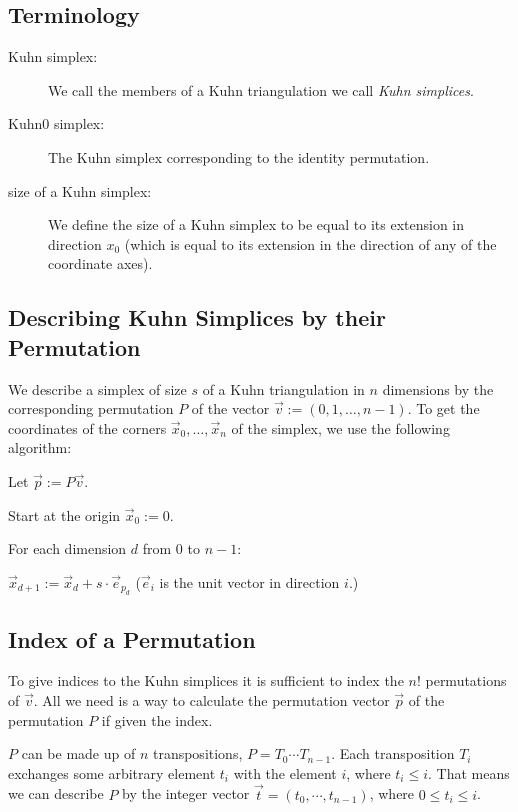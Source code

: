 \documentclass[english,a4paper]{article}
\begin{document}
\subsection{Terminology}

\begin{description}
\item[Kuhn simplex:] We call the members of a Kuhn triangulation we
  call {\em Kuhn simplices}.
\item[Kuhn0 simplex:] The Kuhn simplex corresponding to the identity
  permutation.
\item[size of a Kuhn simplex:] We define the size of a Kuhn simplex to
  be equal to its extension in direction $x_0$ (which is equal to its
  extension in the direction of any of the coordinate axes).
\end{description}

\subsection{Describing Kuhn Simplices by their Permutation}

We describe a simplex of size $s$ of a Kuhn triangulation in $n$
dimensions by the corresponding permutation $P$ of the vector
$\vec{v}:=(0,1,\ldots,n-1)$.  To get the coordinates of the corners
$\vec{x}_0,\ldots,\vec{x}_n$ of the simplex, we use the following
algorithm:
\begin{compactitem}
\item Let $\vec{p}:=P\vec{v}$.
\item Start at the origin $\vec{x}_0:=0$.
\item For each dimension $d$ from $0$ to $n-1$:
  \begin{compactitem}
  \item $\vec{x}_{d+1}:=\vec{x}_d+s\cdot\vec{e}_{p_d}$ ($\vec{e}_i$ is
    the unit vector in direction $i$.)
  \end{compactitem}
\end{compactitem}

\subsection{Index of a Permutation}

To give indices to the Kuhn simplices it is sufficient to index the
$n!$ permutations of $\vec{v}$.  All we need is a way to calculate the
permutation vector $\vec{p}$ of the permutation $P$ if given the
index.

$P$ can be made up of $n$ transpositions, $P=T_0\cdots T_{n-1}$.  Each
transposition $T_i$ exchanges some arbitrary element $t_i$ with the
element $i$, where $t_i\leq i$.  That means we can describe $P$ by the
integer vector $\vec{t}=(t_0,\cdots,t_{n-1})$, where $0\leq t_i\leq
i$.
\end{document}

